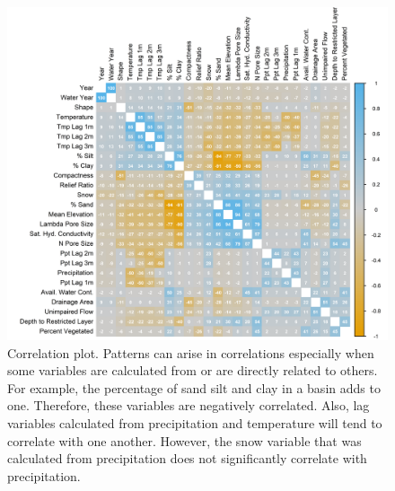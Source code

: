 \begin{figure}
	\centering
	\includegraphics[width=\textwidth, trim={0 0 0 0}, clip=true]{plots/rplot07_corrplot.png}
	\caption{Correlation plot. Patterns can arise in correlations especially when some variables are calculated from or are directly related to others. For example, the percentage of sand silt and clay in a basin adds to one. Therefore, these variables are negatively correlated. Also, lag variables calculated from precipitation and temperature will tend to correlate with one another. However, the snow variable that was calculated from precipitation does not significantly correlate with precipitation.} 
	\label{fig:corrplot}
\end{figure}

